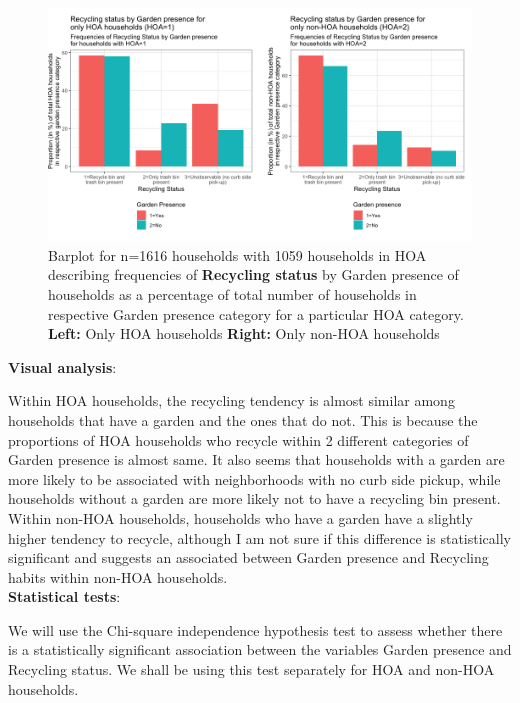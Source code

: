 \documentclass{article}
\begin{document}
\begin{figure}[H]
\centering
\includegraphics[scale=2]{RecycleGarden_final.png}
\caption{Barplot for n=1616 households with 1059 households in HOA describing frequencies of \textbf{Recycling status} by Garden presence of households as a percentage of total number of households in respective Garden presence category for a particular HOA category. \textbf{Left:} Only HOA households \textbf{Right:} Only non-HOA households} \label{Fig:Plot1}
\end{figure}

\textbf{Visual analysis}:

Within HOA households, the recycling tendency is almost similar among households that have a garden and the ones that do not. This is because the proportions of HOA households who recycle within 2 different categories of Garden presence is almost same. It also seems that households with a garden are more likely to be associated with neighborhoods with no curb side pickup, while households without a garden are more likely not to have a recycling bin present.\\

Within non-HOA households, households who have a garden have a slightly higher tendency to recycle, although I am not sure if this difference is statistically significant and suggests an associated between Garden presence and Recycling habits within non-HOA households.\\

\textbf{Statistical tests}:

We will use the Chi-square independence hypothesis test to assess whether there is a statistically significant association between the variables Garden presence and Recycling status. We shall be using this test separately for HOA and non-HOA households.
\end{document}

